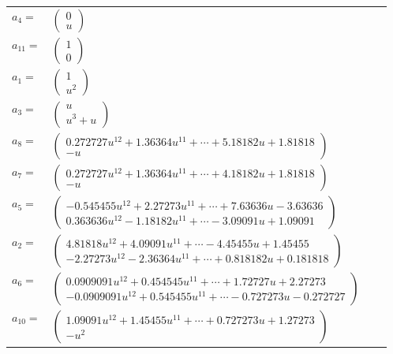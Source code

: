 \documentclass[1p]{elsarticle_modified}
\theoremstyle{definition}
\begin{document}
\begin{tabular}{m{7pt} m{180pt} m{7pt} m{180pt} }
\flushright $a_{4}=$&$\begin{pmatrix}0\\u\end{pmatrix}$ \\
\flushright $a_{11}=$&$\begin{pmatrix}1\\0\end{pmatrix}$ \\
\flushright $a_{1}=$&$\begin{pmatrix}1\\u^2\end{pmatrix}$ \\
\flushright $a_{3}=$&$\begin{pmatrix}u\\u^3+u\end{pmatrix}$ \\
\flushright $a_{8}=$&$\begin{pmatrix}0.272727 u^{12}+1.36364 u^{11}+\cdots+5.18182 u+1.81818\\- u\end{pmatrix}$ \\
\flushright $a_{7}=$&$\begin{pmatrix}0.272727 u^{12}+1.36364 u^{11}+\cdots+4.18182 u+1.81818\\- u\end{pmatrix}$ \\
\flushright $a_{5}=$&$\begin{pmatrix}-0.545455 u^{12}+2.27273 u^{11}+\cdots+7.63636 u-3.63636\\0.363636 u^{12}-1.18182 u^{11}+\cdots-3.09091 u+1.09091\end{pmatrix}$ \\
\flushright $a_{2}=$&$\begin{pmatrix}4.81818 u^{12}+4.09091 u^{11}+\cdots-4.45455 u+1.45455\\-2.27273 u^{12}-2.36364 u^{11}+\cdots+0.818182 u+0.181818\end{pmatrix}$ \\
\flushright $a_{6}=$&$\begin{pmatrix}0.0909091 u^{12}+0.454545 u^{11}+\cdots+1.72727 u+2.27273\\-0.0909091 u^{12}+0.545455 u^{11}+\cdots-0.727273 u-0.272727\end{pmatrix}$ \\
\flushright $a_{10}=$&$\begin{pmatrix}1.09091 u^{12}+1.45455 u^{11}+\cdots+0.727273 u+1.27273\\- u^2\end{pmatrix}$ \\

\end{tabular}
\end{document}
